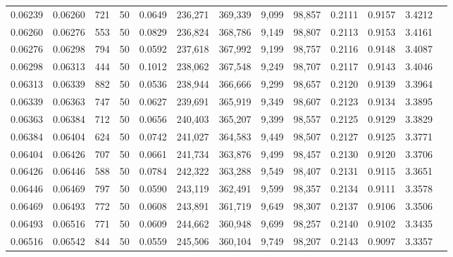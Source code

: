 \begin{tabular}{rrrrrrrrrrrrr}
0.06239 & 0.06260 &   721 &  50 &                                     0.0649 & 236,271 & 369,339 &   9,099 &  98,857 & 0.2111 & 0.9157 & 3.4212 \\
0.06260 & 0.06276 &   553 &  50 &                                     0.0829 & 236,824 & 368,786 &   9,149 &  98,807 & 0.2113 & 0.9153 & 3.4161 \\
0.06276 & 0.06298 &   794 &  50 &                                     0.0592 & 237,618 & 367,992 &   9,199 &  98,757 & 0.2116 & 0.9148 & 3.4087 \\
0.06298 & 0.06313 &   444 &  50 &                                     0.1012 & 238,062 & 367,548 &   9,249 &  98,707 & 0.2117 & 0.9143 & 3.4046 \\
0.06313 & 0.06339 &   882 &  50 &                                     0.0536 & 238,944 & 366,666 &   9,299 &  98,657 & 0.2120 & 0.9139 & 3.3964 \\
0.06339 & 0.06363 &   747 &  50 &                                     0.0627 & 239,691 & 365,919 &   9,349 &  98,607 & 0.2123 & 0.9134 & 3.3895 \\
0.06363 & 0.06384 &   712 &  50 &                                     0.0656 & 240,403 & 365,207 &   9,399 &  98,557 & 0.2125 & 0.9129 & 3.3829 \\
0.06384 & 0.06404 &   624 &  50 &                                     0.0742 & 241,027 & 364,583 &   9,449 &  98,507 & 0.2127 & 0.9125 & 3.3771 \\
0.06404 & 0.06426 &   707 &  50 &                                     0.0661 & 241,734 & 363,876 &   9,499 &  98,457 & 0.2130 & 0.9120 & 3.3706 \\
0.06426 & 0.06446 &   588 &  50 &                                     0.0784 & 242,322 & 363,288 &   9,549 &  98,407 & 0.2131 & 0.9115 & 3.3651 \\
0.06446 & 0.06469 &   797 &  50 &                                     0.0590 & 243,119 & 362,491 &   9,599 &  98,357 & 0.2134 & 0.9111 & 3.3578 \\
0.06469 & 0.06493 &   772 &  50 &                                     0.0608 & 243,891 & 361,719 &   9,649 &  98,307 & 0.2137 & 0.9106 & 3.3506 \\
0.06493 & 0.06516 &   771 &  50 &                                     0.0609 & 244,662 & 360,948 &   9,699 &  98,257 & 0.2140 & 0.9102 & 3.3435 \\
0.06516 & 0.06542 &   844 &  50 &                                     0.0559 & 245,506 & 360,104 &   9,749 &  98,207 & 0.2143 & 0.9097 & 3.3357 \\

\end{tabular}
